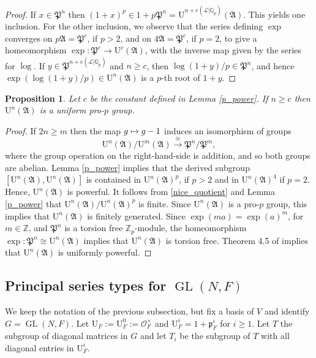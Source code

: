 \documentclass[11pt]{article}
\let\mathcal\mathscr
\newcommand\mto{\mathchoice{\longmapsto}{\mapsto}{\mapsto}{\mapsto}}
\newtheorem{prop}{Proposition}[section]
\theoremstyle{definition}
\DeclareMathOperator{\GL}{GL}
\newcommand{\Qp}{\mathbb {Q}_p}
\newcommand{\Zp}{\mathbb{Z}_p}
\newcommand{\ZZ}{\mathbb Z}
\newcommand{\cO}{\mathcal{O}}
\newcommand{\pp}{\mathfrak p}
\newcommand{\UU}{\mathrm U}
\begin{document}
\begin{proof} If $x\in \mathfrak P^n$ then $(1+x)^p\in 1 + p\mathfrak P^n= \UU^{n+e(\mathcal L|\Qp)}(\mathfrak A)$. This yields one inclusion. For the other
inclusion, we observe that the series defining $\exp$ converges on $p \mathfrak A=\mathfrak P^c$, if $p>2$, and on $4 \mathfrak A= \mathfrak P^c$, if $p=2$, to give
a homeomorphism $\exp: \mathfrak P^c\to \UU^{c}(\mathfrak A)$, with the inverse map given by the series for $\log$. If $y\in \mathfrak P^{n+e(\mathcal L|\Qp)}$
and $n\ge c$, then $\log(1+y)/p \in \mathfrak P^n$, and hence $\exp(\log(1+y)/p)\in \UU^n(\mathfrak A)$ is a $p$-th root of $1+y$.
\end{proof}

\begin{prop}\label{uniform} Let $c$ be the constant defined in Lemma \ref{p_power}. If $n\ge c$ then $\UU^n(\mathfrak A)$ is a uniform pro-$p$ group.
\end{prop}

\begin{proof} If $2n\ge m$ then the map $g\mto g-1$ induces an isomorphism of groups
\begin{equation}\label{nice_quotient}
\UU^{n}(\mathfrak A)/\UU^{m}(\mathfrak A)\overset{\cong}{\to}\mathfrak P^n/\mathfrak P^m,
\end{equation}
where the group operation on the right-hand-side is addition, and so both groups are abelian. Lemma \ref{p_power} implies that the derived subgroup
$[\UU^n(\mathfrak A), \UU^n(\mathfrak A)]$ is contained in $\UU^n(\mathfrak A)^p$, if $p>2$ and in $\UU^n(\mathfrak A)^4$ if $p=2$. Hence, $\UU^n(\mathfrak A)$ is powerful. It follows from
\eqref{nice_quotient} and Lemma \ref{p_power} that $\UU^n(\mathfrak A)/ \UU^n(\mathfrak A)^p$ is finite. Since $\UU^n(\mathfrak A)$ is a pro-$p$
group, this implies that $\UU^n(\mathfrak A)$ is finitely generated. Since $\exp(m a)= \exp(a)^m$, for $m\in \ZZ$, and $\mathfrak P^n$ is a torsion free $\Zp$-module, the homeomorphism
$\exp: \mathfrak P^n \cong \UU^n(\mathfrak A)$ implies that $\UU^n(\mathfrak A)$ is torsion free. Theorem 4.5 of \cite{analytic} implies that $\UU^n(\mathfrak A)$ is uniformly powerful.
\end{proof}

\subsection{Principal series types for $\GL(N, F)$}\label{sec_prince} We keep the notation of the previous subsection, but fix a basis of $V$ and identify $G=\GL(N, F)$.
Let $\UU_F:=\UU^0_F:=\cO_F^{\times}$ and $\UU^i_F=1+\pp_F^i$ for $i\ge 1$. Let $T$ the subgroup of diagonal matrices in $G$ and
let $T_i$ be the subgroup of $T$ with all diagonal entries in $\UU^i_F$.
\end{document}

